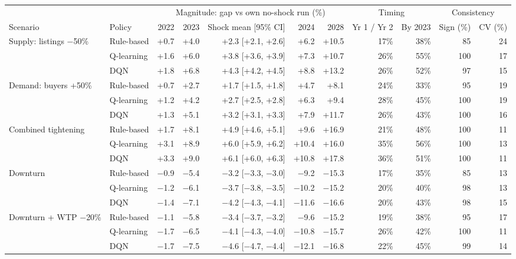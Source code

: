 \begin{tabular}{llrrrrrrrrr}
\toprule
 & & \multicolumn{5}{c}{Magnitude: gap vs own no-shock run (\%)} & \multicolumn{2}{c}{Timing} & \multicolumn{2}{c}{Consistency} \\
\cmidrule(lr){3-7}\cmidrule(lr){8-9}\cmidrule(lr){10-11}
Scenario & Policy & 2022 & 2023 & Shock mean [95\% CI] & 2024 & 2028 & Yr 1 / Yr 2 & By 2023 & Sign (\%) & CV (\%) \\
\midrule
Supply: listings $-$50\% & Rule-based & +0.7 & +4.0 & +2.3 [+2.1, +2.6] & +6.2 & +10.5 & 17\% & 38\% & 85 & 24 \\
 & Q-learning & +1.6 & +6.0 & +3.8 [+3.6, +3.9] & +7.3 & +10.7 & 26\% & 55\% & 100 & 17 \\
 & DQN & +1.8 & +6.8 & +4.3 [+4.2, +4.5] & +8.8 & +13.2 & 26\% & 52\% & 97 & 15 \\
\addlinespace
Demand: buyers +50\% & Rule-based & +0.7 & +2.7 & +1.7 [+1.5, +1.8] & +4.7 & +8.1 & 24\% & 33\% & 95 & 19 \\
 & Q-learning & +1.2 & +4.2 & +2.7 [+2.5, +2.8] & +6.3 & +9.4 & 28\% & 45\% & 100 & 19 \\
 & DQN & +1.3 & +5.1 & +3.2 [+3.1, +3.3] & +7.9 & +11.7 & 26\% & 43\% & 100 & 16 \\
\addlinespace
Combined tightening & Rule-based & +1.7 & +8.1 & +4.9 [+4.6, +5.1] & +9.6 & +16.9 & 21\% & 48\% & 100 & 11 \\
 & Q-learning & +3.1 & +8.9 & +6.0 [+5.9, +6.2] & +10.4 & +16.0 & 35\% & 56\% & 100 & 13 \\
 & DQN & +3.3 & +9.0 & +6.1 [+6.0, +6.3] & +10.8 & +17.8 & 36\% & 51\% & 100 & 11 \\
\addlinespace
Downturn & Rule-based & $-$0.9 & $-$5.4 & $-$3.2 [$-$3.3, $-$3.0] & $-$9.2 & $-$15.3 & 17\% & 35\% & 85 & 13 \\
 & Q-learning & $-$1.2 & $-$6.1 & $-$3.7 [$-$3.8, $-$3.5] & $-$10.2 & $-$15.2 & 20\% & 40\% & 98 & 13 \\
 & DQN & $-$1.4 & $-$7.1 & $-$4.2 [$-$4.3, $-$4.1] & $-$11.6 & $-$16.6 & 20\% & 43\% & 98 & 15 \\
\addlinespace
Downturn + WTP $-$20\% & Rule-based & $-$1.1 & $-$5.8 & $-$3.4 [$-$3.7, $-$3.2] & $-$9.6 & $-$15.2 & 19\% & 38\% & 95 & 17 \\
 & Q-learning & $-$1.7 & $-$6.5 & $-$4.1 [$-$4.3, $-$4.0] & $-$10.8 & $-$15.7 & 26\% & 42\% & 100 & 11 \\
 & DQN & $-$1.7 & $-$7.5 & $-$4.6 [$-$4.7, $-$4.4] & $-$12.1 & $-$16.8 & 22\% & 45\% & 99 & 14 \\
\bottomrule
\end{tabular}
